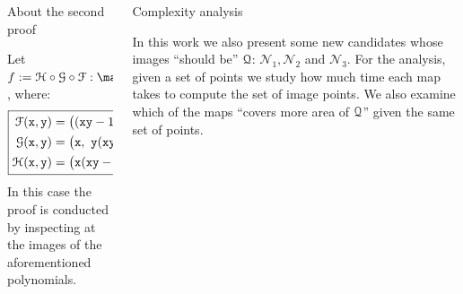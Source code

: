 \documentclass[final]{beamer}
\newlength{\onecolwid}
\newlength{\twocolwid}
\begin{document}
\begin{frame}[t]
\begin{columns}[t]
\begin{column}{\twocolwid}
\begin{columns}[t,totalwidth=\twocolwid]
\begin{column}{\onecolwid}
\vspace{-0.75cm}
 
\begin{block}{About the second proof}
 
Let $f:=\HH\circ\GG\circ\FF:\R^2\to\R^2$, where:
\begin{equation*}\label{eq:secondMap}
\boxed{
\begin{aligned}
\mathcal{F}({\tt x},{\tt y}) &= \big(({\tt x}{\tt y}-1)^2+{\tt x}^2,\ ({\tt x}{\tt y}-1)^2+{\tt y}^2\big),\\
\mathcal{G}({\tt x},{\tt y}) &= \big({\tt x},\ {\tt y}({\tt x}{\tt y}-2)^2+{\tt x}({\tt x}{\tt y}-1)^2\big),\\
\mathcal{H}({\tt x},{\tt y}) &= \big({\tt x}({\tt x}{\tt y}-2)^2+\tfrac{1}{2}{\tt x}{\tt y}^2,\ {\tt y}\big). \\
\end{aligned}
}
\end{equation*}
In this case the proof is conducted by inspecting at the images of the aforementioned polynomials.
 
\end{block}
 
 
\end{column} %
 
\begin{column}{\onecolwid} %

\vspace{-0.75cm}
 
\begin{block}{Complexity analysis}

In this work we also present some new candidates whose images ``should be'' $\mathcal{Q}$: $\mathcal{N}_1, \mathcal{N}_2$ and $\mathcal{N}_3$.
For the analysis, given a set of points we study how much time each map takes to compute the set of image points. We also examine which of the maps ``covers more area of $\mathcal{Q}$'' given the same set of points.
 
\end{block}
 
 

\end{column}
\end{columns}
\end{column}
\end{columns}
\end{frame}
\end{document}
